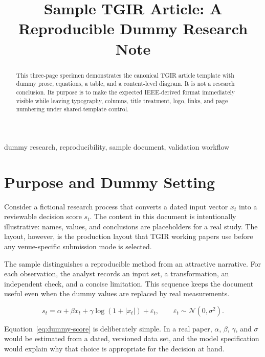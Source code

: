 \documentclass[conference]{IEEEtran}
\title{Sample TGIR Article: A Reproducible Dummy Research Note}
\author{\TGIRArticleAuthorBlock}
\begin{document}
\maketitle

\begin{abstract}
This three-page specimen demonstrates the canonical TGIR article template with
dummy prose, equations, a table, and a content-level diagram. It is not a
research conclusion. Its purpose is to make the expected IEEE-derived format
immediately visible while leaving typography, columns, title treatment, logo,
links, and page numbering under shared-template control.
\end{abstract}

\begin{IEEEkeywords}
dummy research, reproducibility, sample document, validation workflow
\end{IEEEkeywords}

\section{Purpose and Dummy Setting}

Consider a fictional research process that converts a dated input vector
$x_t$ into a reviewable decision score $s_t$. The content in this document is
intentionally illustrative: names, values, and conclusions are placeholders
for a real study. The layout, however, is the production layout that TGIR
working papers use before any venue-specific submission mode is selected.

\lipsum[1]

The sample distinguishes a reproducible method from an attractive narrative.
For each observation, the analyst records an input set, a transformation, an
independent check, and a concise limitation. This sequence keeps the document
useful even when the dummy values are replaced by real measurements.

\begin{equation}
  s_t = \alpha + \beta x_t + \gamma \log(1 + |x_t|) + \varepsilon_t,
  \qquad \varepsilon_t \sim \mathcal{N}(0, \sigma^2).
  \label{eq:dummy-score}
\end{equation}

Equation~\eqref{eq:dummy-score} is deliberately simple. In a real paper,
$\alpha$, $\beta$, $\gamma$, and $\sigma$ would be estimated from a dated,
versioned data set, and the model specification would explain why that choice
is appropriate for the decision at hand.
\end{document}
